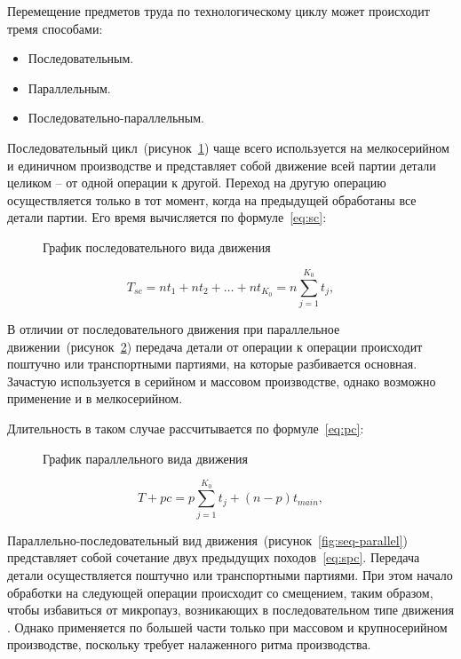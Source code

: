 Перемещение предметов труда по технологическому циклу может происходит тремя способами:

\begin{itemize}
 	\item Последовательным.
	\item Параллельным.
    \item Последовательно-параллельным.
\end{itemize}

Последовательный цикл~(рисунок~\cref{fig:seq}) чаще всего используется на мелкосерийном и единичном производстве и представляет собой движение всей партии детали целиком -- от одной операции к другой. Переход на другую операцию осуществляется только в тот момент, когда на предыдущей обработаны все детали партии.
Его время вычисляется по формуле~\cref{eq:sc}:

\begin{figure}[!htb]
	\caption{График последовательного вида движения}\label{fig:seq}
\end{figure}

\begin{equation}
T_{sc} = n t_{1} + n t_{2} + \ldots + n t_{K_0} = n \sum_{j=1}^{K_{0}}t_{j},
\label{eq:sc}
\end{equation}

В отличии от последовательного движения при параллельное движении~(рисунок~\cref{fig:parallel}) передача детали от операции к операции происходит поштучно или транспортными партиями, на которые разбивается основная. Зачастую используется в серийном и массовом производстве, однако возможно применение и в мелкосерийном.

Длительность в таком случае рассчитывается по формуле~\cref{eq:pc}:

\begin{figure}[!htb]
	\caption{График параллельного вида движения}\label{fig:parallel}
\end{figure}

\begin{equation}
T+{pc} = p\sum_{j=1}^{K_{0}}t_{j}+(n-p)t_{main},
\label{eq:pc}
\end{equation}

Параллельно-последовательный вид движения~(рисунок~\cref{fig:seq-parallel}) представляет собой сочетание двух предыдущих походов~\cref{eq:spc}. Передача детали осуществляется поштучно или транспортными партиями. При этом начало обработки на следующей операции происходит со смещением, таким образом, чтобы избавиться от микропауз, возникающих в последовательном типе движения . Однако применяется по большей части только при массовом и крупносерийном производстве, поскольку требует налаженного ритма производства.

